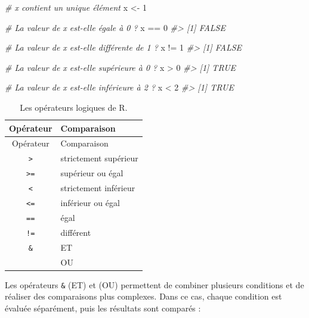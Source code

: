 \documentclass[
  french,
]{scrbook}
\newenvironment{Shaded}{\begin{snugshade}}{\end{snugshade}}
\newcommand{\CommentTok}[1]{\textcolor[rgb]{0.56,0.35,0.01}{\textit{#1}}}
\newcommand{\DecValTok}[1]{\textcolor[rgb]{0.00,0.00,0.81}{#1}}
\newcommand{\NormalTok}[1]{#1}
\newcommand{\OtherTok}[1]{\textcolor[rgb]{0.56,0.35,0.01}{#1}}
\newcommand{\SpecialCharTok}[1]{\textcolor[rgb]{0.00,0.00,0.00}{#1}}
\begin{document}
\begin{Shaded}
\begin{Highlighting}[]
\CommentTok{\# x contient un unique élément}
\NormalTok{x }\OtherTok{\textless{}{-}} \DecValTok{1}

\CommentTok{\# La valeur de x est{-}elle égale à 0 ?}
\NormalTok{x }\SpecialCharTok{==} \DecValTok{0}
\CommentTok{\#\textgreater{} [1] FALSE}

\CommentTok{\# La valeur de x est{-}elle différente de 1 ?}
\NormalTok{x }\SpecialCharTok{!=} \DecValTok{1}
\CommentTok{\#\textgreater{} [1] FALSE}

\CommentTok{\# La valeur de x est{-}elle supérieure à 0 ?}
\NormalTok{x }\SpecialCharTok{\textgreater{}} \DecValTok{0}
\CommentTok{\#\textgreater{} [1] TRUE}

\CommentTok{\# La valeur de x est{-}elle inférieure à 2 ?}
\NormalTok{x }\SpecialCharTok{\textless{}} \DecValTok{2}
\CommentTok{\#\textgreater{} [1] TRUE}
\end{Highlighting}
\end{Shaded}

\begin{longtable}[]{@{}cl@{}}
\caption{\label{tab:operateurs-logiques} Les opérateurs logiques de R.}\tabularnewline
\toprule
Opérateur & Comparaison \\
\midrule
\endfirsthead
\toprule
Opérateur & Comparaison \\
\midrule
\endhead
\texttt{\textgreater{}} & strictement supérieur \\
\texttt{\textgreater{}=} & supérieur ou égal \\
\texttt{\textless{}} & strictement inférieur \\
\texttt{\textless{}=} & inférieur ou égal \\
\texttt{==} & égal \\
\texttt{!=} & différent \\
\texttt{\&} & ET \\
\texttt{\textbar{}} & OU \\
\bottomrule
\end{longtable}

Les opérateurs \texttt{\&} (ET) et \texttt{\textbar{}} (OU) permettent de combiner plusieurs conditions et de réaliser des comparaisons plus complexes. Dans ce cas, chaque condition est évaluée séparément, puis les résultats sont comparés :
\end{document}

